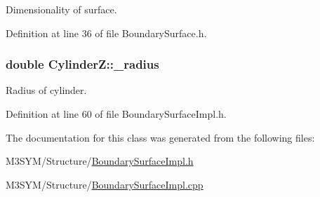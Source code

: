 Dimensionality of surface. 



Definition at line 36 of file Boundary\+Surface.\+h.

\hypertarget{classCylinderZ_afee3f9138c8cca63a58926a740c9ebdc}{
\subsubsection[{\+\_\+radius}]{\setlength{\rightskip}{0pt plus 5cm}double Cylinder\+Z\+::\+\_\+radius\hspace{0.3cm}{\ttfamily [private]}}}\label{classCylinderZ_afee3f9138c8cca63a58926a740c9ebdc}


Radius of cylinder. 



Definition at line 60 of file Boundary\+Surface\+Impl.\+h.



The documentation for this class was generated from the following files\+:\begin{DoxyCompactItemize}
\item 
M3\+S\+Y\+M/\+Structure/\hyperlink{BoundarySurfaceImpl_8h}{Boundary\+Surface\+Impl.\+h}\item 
M3\+S\+Y\+M/\+Structure/\hyperlink{BoundarySurfaceImpl_8cpp}{Boundary\+Surface\+Impl.\+cpp}\end{DoxyCompactItemize}
